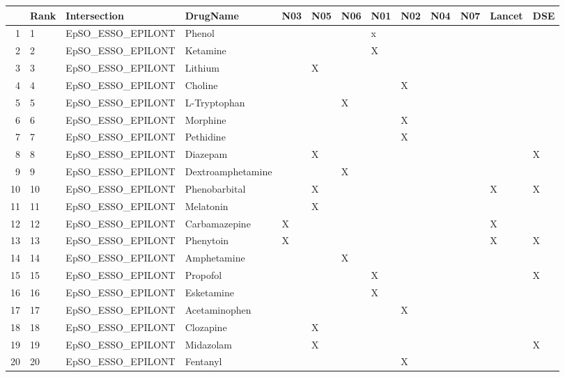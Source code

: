 \begin{table}[ht]
\centering
\begin{tabular}{rllllllllllll}
  \hline
 & Rank & Intersection & DrugName & N03 & N05 & N06 & N01 & N02 & N04 & N07 & Lancet & DSE \\ 
  \hline
1 & 1 & EpSO\_ESSO\_EPILONT & Phenol &  &  &  & x &  &  &  &  &  \\ 
  2 & 2 & EpSO\_ESSO\_EPILONT & Ketamine &  &  &  & X &  &  &  &  &  \\ 
  3 & 3 & EpSO\_ESSO\_EPILONT & Lithium &  & X &  &  &  &  &  &  &  \\ 
  4 & 4 & EpSO\_ESSO\_EPILONT & Choline &  &  &  &  & X &  &  &  &  \\ 
  5 & 5 & EpSO\_ESSO\_EPILONT & L-Tryptophan &  &  & X &  &  &  &  &  &  \\ 
  6 & 6 & EpSO\_ESSO\_EPILONT & Morphine &  &  &  &  & X &  &  &  &  \\ 
  7 & 7 & EpSO\_ESSO\_EPILONT & Pethidine &  &  &  &  & X &  &  &  &  \\ 
  8 & 8 & EpSO\_ESSO\_EPILONT & Diazepam &  & X &  &  &  &  &  &  & X \\ 
  9 & 9 & EpSO\_ESSO\_EPILONT & Dextroamphetamine &  &  & X &  &  &  &  &  &  \\ 
  10 & 10 & EpSO\_ESSO\_EPILONT & Phenobarbital &  & X &  &  &  &  &  & X & X \\ 
  11 & 11 & EpSO\_ESSO\_EPILONT & Melatonin &  & X &  &  &  &  &  &  &  \\ 
  12 & 12 & EpSO\_ESSO\_EPILONT & Carbamazepine & X &  &  &  &  &  &  & X &  \\ 
  13 & 13 & EpSO\_ESSO\_EPILONT & Phenytoin & X &  &  &  &  &  &  & X & X \\ 
  14 & 14 & EpSO\_ESSO\_EPILONT & Amphetamine &  &  & X &  &  &  &  &  &  \\ 
  15 & 15 & EpSO\_ESSO\_EPILONT & Propofol &  &  &  & X &  &  &  &  & X \\ 
  16 & 16 & EpSO\_ESSO\_EPILONT & Esketamine &  &  &  & X &  &  &  &  &  \\ 
  17 & 17 & EpSO\_ESSO\_EPILONT & Acetaminophen &  &  &  &  & X &  &  &  &  \\ 
  18 & 18 & EpSO\_ESSO\_EPILONT & Clozapine &  & X &  &  &  &  &  &  &  \\ 
  19 & 19 & EpSO\_ESSO\_EPILONT & Midazolam &  & X &  &  &  &  &  &  & X \\ 
  20 & 20 & EpSO\_ESSO\_EPILONT & Fentanyl &  &  &  &  & X &  &  &  &  \\ 

\end{tabular}
\end{table}

